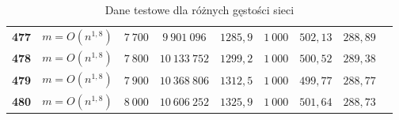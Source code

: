\begin{table}[h]
\begin{tabular}{lcccccccc}
		\textbf{477} & $ m = O \left( n^{1,8} \right) $ & $7~700$ & $9~901~096$ & $1285,9$ & $1~000$ & $502,13$ & $288,89$ &  \\
		\textbf{478} & $ m = O \left( n^{1,8} \right) $ & $7~800$ & $10~133~752$ & $1299,2$ & $1~000$ & $500,52$ & $289,38$ &  \\
		\textbf{479} & $ m = O \left( n^{1,8} \right) $ & $7~900$ & $10~368~806$ & $1312,5$ & $1~000$ & $499,77$ & $288,77$ &  \\
		\textbf{480} & $ m = O \left( n^{1,8} \right) $ & $8~000$ & $10~606~252$ & $1325,9$ & $1~000$ & $501,64$ & $288,73$ &  \\
		\hline
	\end{tabular}
	\caption{
		Dane testowe dla różnych gęstości sieci
	}
	\label{tab:denceTest}
\end{table}

